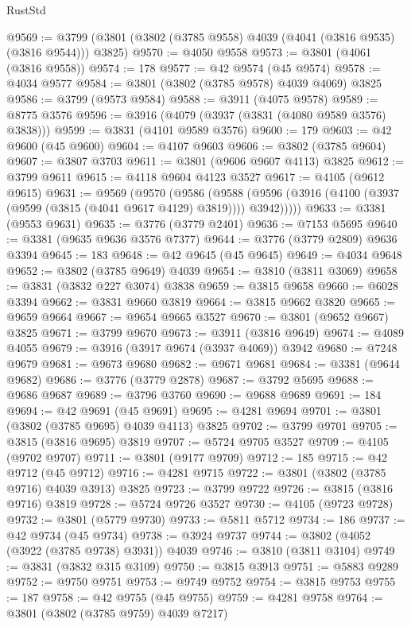 \begin{lexlean}{RustStd}
\begin{coremodule}
@9569 := @3799 (@3801 (@3802 (@3785 @9558) @4039 (@4041 (@3816 @9535) (@3816 @9544))) @3825)
@9570 := @4050 @9558
@9573 := @3801 (@4061 (@3816 @9558))
@9574 := 178
@9577 := @42 @9574 (@45 @9574)
@9578 := @4034 @9577
@9584 := @3801 (@3802 (@3785 @9578) @4039 @4069) @3825
@9586 := @3799 (@9573 @9584)
@9588 := @3911 (@4075 @9578)
@9589 := @8775 @3576
@9596 := @3916 (@4079 (@3937 (@3831 (@4080 @9589 @3576) @3838)))
@9599 := @3831 (@4101 @9589 @3576)
@9600 := 179
@9603 := @42 @9600 (@45 @9600)
@9604 := @4107 @9603
@9606 := @3802 (@3785 @9604)
@9607 := @3807 @3703
@9611 := @3801 (@9606 @9607 @4113) @3825
@9612 := @3799 @9611
@9615 := @4118 @9604 @4123 @3527
@9617 := @4105 (@9612 @9615)
@9631 := @9569
    (@9570
      (@9586
        (@9588 (@9596 (@3916 (@4100 (@3937 (@9599 (@3815 (@4041 @9617 @4129) @3819)))) @3942)))))
@9633 := @3381 (@9553 @9631)
@9635 := @3776 (@3779 @2401)
@9636 := @7153 @5695
@9640 := @3381 (@9635 @9636 @3576 @7377)
@9644 := @3776 (@3779 @2809) @9636 @3394
@9645 := 183
@9648 := @42 @9645 (@45 @9645)
@9649 := @4034 @9648
@9652 := @3802 (@3785 @9649) @4039
@9654 := @3810 (@3811 @3069)
@9658 := @3831 (@3832 @227 @3074) @3838
@9659 := @3815 @9658
@9660 := @6028 @3394
@9662 := @3831 @9660 @3819
@9664 := @3815 @9662 @3820
@9665 := @9659 @9664
@9667 := @9654 @9665 @3527
@9670 := @3801 (@9652 @9667) @3825
@9671 := @3799 @9670
@9673 := @3911 (@3816 @9649)
@9674 := @4089 @4055
@9679 := @3916 (@3917 @9674 (@3937 @4069)) @3942
@9680 := @7248 @9679
@9681 := @9673 @9680
@9682 := @9671 @9681
@9684 := @3381 (@9644 @9682)
@9686 := @3776 (@3779 @2878)
@9687 := @3792 @5695
@9688 := @9686 @9687
@9689 := @3796 @3760
@9690 := @9688 @9689
@9691 := 184
@9694 := @42 @9691 (@45 @9691)
@9695 := @4281 @9694
@9701 := @3801 (@3802 (@3785 @9695) @4039 @4113) @3825
@9702 := @3799 @9701
@9705 := @3815 (@3816 @9695) @3819
@9707 := @5724 @9705 @3527
@9709 := @4105 (@9702 @9707)
@9711 := @3801 (@9177 @9709)
@9712 := 185
@9715 := @42 @9712 (@45 @9712)
@9716 := @4281 @9715
@9722 := @3801 (@3802 (@3785 @9716) @4039 @3913) @3825
@9723 := @3799 @9722
@9726 := @3815 (@3816 @9716) @3819
@9728 := @5724 @9726 @3527
@9730 := @4105 (@9723 @9728)
@9732 := @3801 (@5779 @9730)
@9733 := @5811 @5712
@9734 := 186
@9737 := @42 @9734 (@45 @9734)
@9738 := @3924 @9737
@9744 := @3802 (@4052 (@3922 (@3785 @9738) @3931)) @4039
@9746 := @3810 (@3811 @3104)
@9749 := @3831 (@3832 @315 @3109)
@9750 := @3815 @3913
@9751 := @5883 @9289
@9752 := @9750 @9751
@9753 := @9749 @9752
@9754 := @3815 @9753
@9755 := 187
@9758 := @42 @9755 (@45 @9755)
@9759 := @4281 @9758
@9764 := @3801 (@3802 (@3785 @9759) @4039 @7217)

\end{coremodule}
\end{lexlean}
